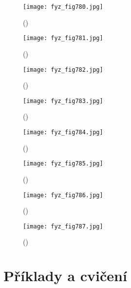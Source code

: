     \begin{figure}[ht!] %
      \centering
      \texttt{[image: fyz\_fig780.jpg]}
      \caption{
               (\cite[s.~707]{Feynman02})}
      \label{fyz_fig780}
    \end{figure}

    \begin{figure}[ht!] %
      \centering
      \texttt{[image: fyz\_fig781.jpg]}
      \caption{
               (\cite[s.~707]{Feynman02})}
      \label{fyz_fig781}
    \end{figure}

    \begin{figure}[ht!] %
      \centering
      \texttt{[image: fyz\_fig782.jpg]}
      \caption{
               (\cite[s.~707]{Feynman02})}
      \label{fyz_fig782}
    \end{figure}

    \begin{figure}[ht!] %
      \centering
      \texttt{[image: fyz\_fig783.jpg]}
      \caption{
               (\cite[s.~707]{Feynman02})}
      \label{fyz_fig783}
    \end{figure}

    \begin{figure}[ht!] %
      \centering
      \texttt{[image: fyz\_fig784.jpg]}
      \caption{
               (\cite[s.~707]{Feynman02})}
      \label{fyz_fig784}
    \end{figure}

    \begin{figure}[ht!] %
      \centering
      \texttt{[image: fyz\_fig785.jpg]}
      \caption{
               (\cite[s.~707]{Feynman02})}
      \label{fyz_fig785}
    \end{figure}

    \begin{figure}[ht!] %
      \centering
      \texttt{[image: fyz\_fig786.jpg]}
      \caption{
               (\cite[s.~707]{Feynman02})}
      \label{fyz_fig786}
    \end{figure}

    \begin{figure}[ht!] %
      \centering
      \texttt{[image: fyz\_fig787.jpg]}
      \caption{
               (\cite[s.~707]{Feynman02})}
      \label{fyz_fig787}
    \end{figure}


  \section{Příklady a cvičení}\label{fyz:IIchapXXXsecX}


\printbibliography[title={Seznam literatury},heading=subbibliography]
